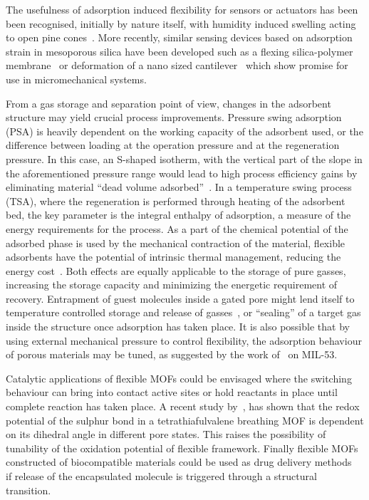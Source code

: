 The usefulness of adsorption induced flexibility for sensors or
actuators has been been recognised, initially by nature itself,
with humidity induced swelling acting to open pine 
cones~\cite{dawsonHowPineCones1997}.
More recently, similar sensing devices based on adsorption strain 
in mesoporous silica have been 
developed such as a flexing silica-polymer 
membrane~\cite{boudotConvertingWaterAdsorption2016} or 
deformation of a nano sized 
cantilever~\cite{ganserCantileverBendingBased2016} 
which show promise for use in micromechanical systems. 

From a gas storage and separation point of view, changes in the
adsorbent structure may yield crucial process improvements. 
Pressure swing adsorption (PSA) is heavily
dependent on the working capacity of the adsorbent used, or the
difference between loading at the operation pressure and at the 
regeneration pressure. In this case, an S-shaped isotherm, with 
the vertical part of the slope in the aforementioned pressure 
range would lead to high process efficiency gains by eliminating material
``dead volume adsorbed''~\cite{schneemannFlexibleMetalOrganic2014}. 
In a temperature swing process (TSA), where 
the regeneration is performed through heating of the adsorbent 
bed, the key parameter is the integral enthalpy of adsorption, a measure 
of the energy requirements for the process. As a part of the chemical 
potential of the adsorbed phase is used by the mechanical contraction
of the material, flexible adsorbents have the potential of
intrinsic thermal management, reducing the energy 
cost~\cite{masonMethaneStorageFlexible2015}.
Both effects are equally applicable to the storage of pure 
gasses, increasing the storage capacity and minimizing the energetic
requirement of recovery. Entrapment of guest molecules inside 
a gated pore might lend itself to temperature controlled storage and 
release of gasses~\cite{bunzenAchievingLargeVolumetric2018}, or
``sealing'' of a target gas inside the structure once adsorption
has taken place.
It is also possible that by using external mechanical pressure to
control flexibility, the adsorption behaviour of porous materials
may be tuned, as suggested by the work 
of~\citet{chanutUsingExternalFactors2016} on MIL-53. 

Catalytic applications of flexible MOFs could be envisaged where 
the switching behaviour can bring into contact active sites or 
hold reactants in place until complete reaction has taken place.
A recent study by~\citet{soutoBreathingDependentRedoxActivity2018},
has shown that the redox potential of the sulphur bond in a 
tetrathiafulvalene breathing MOF is dependent on its dihedral 
angle in different pore states. This raises the possibility of 
tunability of the oxidation potential of flexible framework.
Finally flexible MOFs constructed of biocompatible materials 
could be used as drug delivery 
methods~\cite{mckinlayNitricOxideAdsorption2013, %
horcajadaFlexiblePorousMetalOrganic2008} if release 
of the encapsulated molecule is triggered through a 
structural transition.


